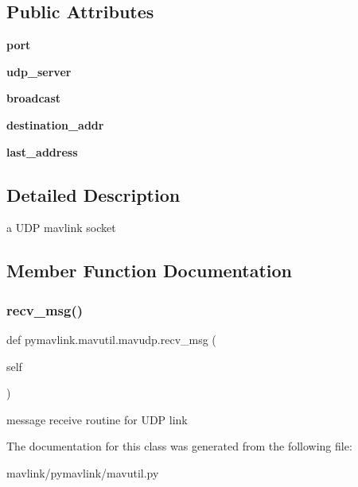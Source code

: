 \subsection*{Public Attributes}
\begin{DoxyCompactItemize}
\item 
\mbox{\label{classpymavlink_1_1mavutil_1_1mavudp_a0ea30c1f7c58ff3c409e50ed8a4b5054}} 
{\bfseries port}
\item 
\mbox{\label{classpymavlink_1_1mavutil_1_1mavudp_a954bbb6e696f876daa2b2b5ef14618ce}} 
{\bfseries udp\+\_\+server}
\item 
\mbox{\label{classpymavlink_1_1mavutil_1_1mavudp_ac5bbd2a998cfe14d2f25dc88a56817bb}} 
{\bfseries broadcast}
\item 
\mbox{\label{classpymavlink_1_1mavutil_1_1mavudp_ab4f8ef948b82aef5124e53c79f4a229a}} 
{\bfseries destination\+\_\+addr}
\item 
\mbox{\label{classpymavlink_1_1mavutil_1_1mavudp_a06c9bffa98ac194a99bd7c4d2cb8b36f}} 
{\bfseries last\+\_\+address}
\end{DoxyCompactItemize}


\subsection{Detailed Description}
\begin{DoxyVerb}a UDP mavlink socket\end{DoxyVerb}
 

\subsection{Member Function Documentation}
\mbox{\label{classpymavlink_1_1mavutil_1_1mavudp_aeb1b82765793d5de815c95caf6863953}} 
\subsubsection{\texorpdfstring{recv\+\_\+msg()}{recv\_msg()}}
{\footnotesize\ttfamily def pymavlink.\+mavutil.\+mavudp.\+recv\+\_\+msg (\begin{DoxyParamCaption}\item[{}]{self }\end{DoxyParamCaption})}

\begin{DoxyVerb}message receive routine for UDP link\end{DoxyVerb}
 

The documentation for this class was generated from the following file\+:\begin{DoxyCompactItemize}
\item 
mavlink/pymavlink/mavutil.\+py\end{DoxyCompactItemize}
